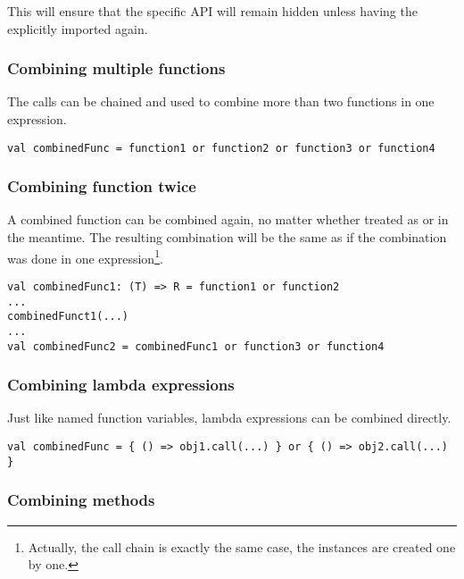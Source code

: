 This will ensure that the  specific API will remain hidden unless having the  explicitly imported again.

\subsubsection{Combining multiple functions}

The  calls can be chained and used to combine more than two functions in one expression.

\lstset{style=Scala}
\begin{lstlisting}
val combinedFunc = function1 or function2 or function3 or function4
\end{lstlisting}

\subsubsection{Combining function twice}

A combined function can be combined again, no matter whether treated as  or  in the meantime. The resulting combination will be the same as if the combination was done in one expression\footnote{Actually, the  call chain is exactly the same case, the  instances are created one by one.}.

\lstset{style=Scala}
\begin{lstlisting}
val combinedFunc1: (T) => R = function1 or function2
...
combinedFunct1(...)
...
val combinedFunc2 = combinedFunc1 or function3 or function4
\end{lstlisting}

\subsubsection{Combining lambda expressions}

Just like named function variables, lambda expressions can be combined directly.

\lstset{style=Scala}
\begin{lstlisting}
val combinedFunc = { () => obj1.call(...) } or { () => obj2.call(...) }
\end{lstlisting}

\subsubsection{Combining methods}
\label{subsubsec:apimethods}

